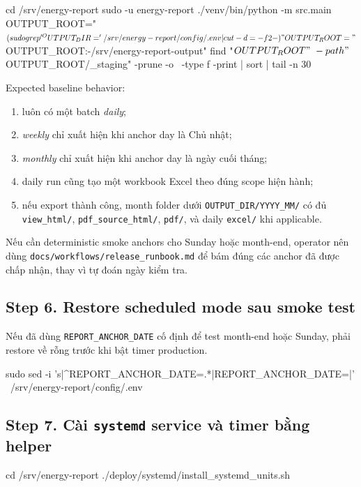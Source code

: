 \begin{ShellBlock}
cd /srv/energy-report
sudo -u energy-report ./venv/bin/python -m src.main
OUTPUT_ROOT="$(sudo grep '^OUTPUT_DIR=' /srv/energy-report/config/.env | cut -d= -f2-)"
OUTPUT_ROOT="${OUTPUT_ROOT:-/srv/energy-report-output}"
find "$OUTPUT_ROOT" \
  -path "$OUTPUT_ROOT/_staging" -prune -o \
  -type f -print | sort | tail -n 30
\end{ShellBlock}

Expected baseline behavior:

\begin{enumerate}[label=-]
\item luôn có một batch \textit{daily};
\item \textit{weekly} chỉ xuất hiện khi anchor day là Chủ nhật;
\item \textit{monthly} chỉ xuất hiện khi anchor day là ngày cuối tháng;
\item daily run cũng tạo một workbook Excel theo đúng scope hiện hành;
\item nếu export thành công, month folder dưới \texttt{OUTPUT\_DIR/YYYY\_MM/} có đủ \texttt{view\_html/}, \texttt{pdf\_source\_html/}, \texttt{pdf/}, và daily \texttt{excel/} khi applicable.
\end{enumerate}

Nếu cần deterministic smoke anchors cho Sunday hoặc month-end, operator nên dùng \texttt{docs/workflows/release\_runbook.md} để bám đúng các anchor đã được chấp nhận, thay vì tự đoán ngày kiểm tra.

\subsection{Step 6. Restore scheduled mode sau smoke test}

Nếu đã dùng \texttt{REPORT\_ANCHOR\_DATE} cố định để test month-end hoặc Sunday, phải restore về rỗng trước khi bật timer production.

\begin{ShellBlock}
sudo sed -i 's|^REPORT_ANCHOR_DATE=.*|REPORT_ANCHOR_DATE=|' \
  /srv/energy-report/config/.env
\end{ShellBlock}

\subsection{Step 7. Cài \texttt{systemd} service và timer bằng helper}

\begin{ShellBlock}
cd /srv/energy-report
./deploy/systemd/install_systemd_units.sh
\end{ShellBlock}

